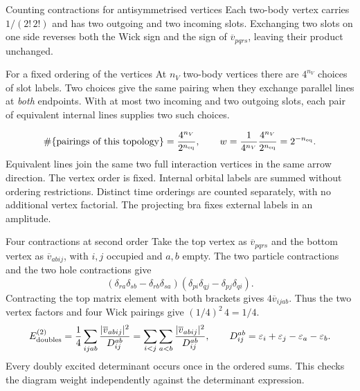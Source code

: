 \documentclass[aspectratio=169,10pt]{beamer}
\newcommand{\vbar}[4]{\overline v_{#1#2#3#4}}
\begin{document}
\begin{frame}{Counting contractions for antisymmetrised vertices}
Each two-body vertex carries $1/(2!\,2!)$ and has two outgoing and two incoming slots. Exchanging two slots on one side reverses both the Wick sign and the sign of $\vbar{p}{q}{r}{s}$, leaving their product unchanged.
\begin{block}{For a fixed ordering of the vertices}
At $n_V$ two-body vertices there are $4^{n_V}$ choices of slot labels.
Two choices give the same pairing when they exchange parallel lines at \emph{both} endpoints. With at most two incoming and two outgoing slots, each pair of equivalent internal lines supplies two such choices.
\end{block}
\[
 \#\{\text{pairings of this topology}\}=\frac{4^{n_V}}{2^{n_{\rm eq}}},
 \qquad
 w=\frac{1}{4^{n_V}}\frac{4^{n_V}}{2^{n_{\rm eq}}}=2^{-n_{\rm eq}} .
\]
Equivalent lines join the same two full interaction vertices in the same arrow direction. The vertex order is fixed. Internal orbital labels are summed without ordering restrictions. Distinct time orderings are counted separately, with no additional vertex factorial. The projecting bra fixes external labels in an amplitude.
\end{frame}

\begin{frame}{Four contractions at second order}
Take the top vertex as $\vbar{p}{q}{r}{s}$ and the bottom vertex as $\vbar{a}{b}{i}{j}$, with $i,j$ occupied and $a,b$ empty. The two particle contractions and the two hole contractions give
\[
 (\delta_{ra}\delta_{sb}-\delta_{rb}\delta_{sa})
 (\delta_{pi}\delta_{qj}-\delta_{pj}\delta_{qi}).
\]
Contracting the top matrix element with both brackets gives $4\vbar{i}{j}{a}{b}$. Thus the two vertex factors and four Wick pairings give $(1/4)^2\,4=1/4$.
\[
 E^{(2)}_{\rm doubles}
 =\frac14\sum_{ijab}\frac{|\vbar{a}{b}{i}{j}|^2}{D_{ij}^{ab}}
 =\sum_{i<j}\sum_{a<b}\frac{|\vbar{a}{b}{i}{j}|^2}{D_{ij}^{ab}},
 \qquad D_{ij}^{ab}=\varepsilon_i+\varepsilon_j-\varepsilon_a-\varepsilon_b .
\]
Every doubly excited determinant occurs once in the ordered sums. This checks the diagram weight independently against the determinant expression.
\end{frame}
\end{document}
